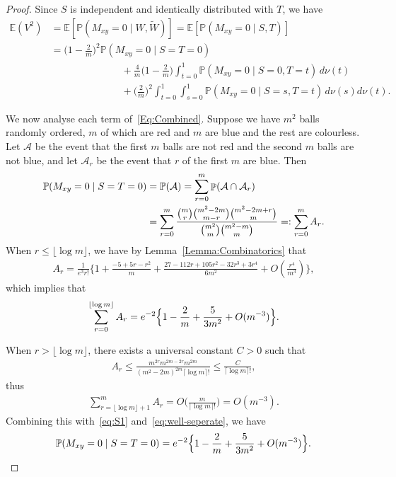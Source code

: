 \documentclass[11pt]{article}
\DeclareMathOperator{\Prob}{\mathbb{P}}
\begin{document}
\begin{proof}
Since $S$ is independent and identically distributed with $T$, we have
\begin{align}
  \mathbb{E}(V^2) &= \mathbb{E}[\mathbb{P}(M_{xy} = 0\mid W, \widetilde W)]=\mathbb{E}[\mathbb{P}(M_{xy} = 0\mid S, T)]\nonumber\\
  &=\biggl(1-\frac{2}{m}\biggr)^2 \mathbb{P}(M_{xy} = 0 \mid S=T=0) \nonumber\\
  &\hspace{3cm} + \frac{4}{m}\biggl(1-\frac{2}{m}\biggr)\int_{t=0}^1 \mathbb{P}(M_{xy} = 0 \mid S=0, T=t)\,d\nu(t) \nonumber\\
&\hspace{3cm} +  \biggl(\frac{2}{m}\biggr)^2\int_{t=0}^1\int_{s=0}^1\mathbb{P}(M_{xy} = 0\mid S=s, T=t)\,d\nu(s) d\nu(t) .\label{Eq:Combined}
\end{align}

We now analyse each term of~\eqref{Eq:Combined}. Suppose we have $m^2$ balls randomly ordered, $m$ of which are red and $m$ are blue and the rest are colourless. Let $\mathcal{A}$ be the event that the first $m$ balls are not red and the second $m$ balls are not blue, and let $\mathcal{A}_r$ be the event that $r$ of the first $m$ are blue. Then 
\begin{align}
  \mathbb{P}(M_{xy} = 0\mid S = T= 0) &= \mathbb{P}(\mathcal{A}) = \sum_{r = 0}^m \Prob(\mathcal{A} \cap \mathcal{A}_r) \notag \\
&=\sum_{r=0}^m\frac{\binom{m}{r}\binom{m^2-2m}{m-r}\binom{m^2-2m+r}{m}}{\binom{m^2}{m}\binom{m^2-m}{m}} =: \sum_{r=0}^m A_r. \label{eq:well-seperate}
\end{align}
When $r \leq \lfloor \log m\rfloor$, we have by Lemma~\ref{Lemma:Combinatorics} that 
\begin{align*}
A_r = \frac{1}{e^3 r!}\biggl\{1 + \frac{-5+5r-r^2}{m} + \frac{27-112r+105r^2-32r^3+3r^4}{6m^2}+O(\frac{r^4}{m^3}) \biggr\}, 
\end{align*}
which implies that 
\begin{align}
    \sum_{r = 0}^{\lfloor\log m\rfloor} A_r  =  e^{-2}\Bigl\{1-\frac{2}{m}+\frac{5}{3m^2}+O(m^{-3})\Bigr\}.\label{eq:S1}
\end{align}

When $r > \lfloor \log m\rfloor$, there exists a universal constant $C > 0$ such that
\begin{align*}
    A_r \leq \frac{m^{2r} m^{2m - 2r} m^{2m}}{(m^2-2m)^{2m}  \lceil \log m\rceil !} \leq \frac{C}{\lceil \log m\rceil !},
\end{align*}
thus 
\begin{align*}
    \sum_{r = \lfloor \log m \rfloor +1}^{m} A_r = O\biggl(\frac{m}{\lceil \log m\rceil !}\biggr) = O(m^{-3}).
\end{align*}
Combining this with~\eqref{eq:S1} and~\eqref{eq:well-seperate}, we have
\begin{equation}
    \mathbb{P}(M_{xy} = 0\mid S = T= 0) = e^{-2}\Bigl\{1-\frac{2}{m}+\frac{5}{3m^2}+O(m^{-3})\Bigr\}.
    \label{Eq:FirstTerm}
\end{equation}


\end{proof}
\end{document}
